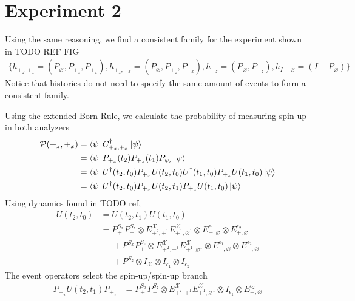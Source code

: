 \section{Experiment 2}

Using the same reasoning, we find a consistent family for the experiment shown in TODO REF FIG
\begin{align}
  \{ h_{+_z,+_x} = \left(P_\varnothing, P_{+_z}, P_{+_x} \right), h_{+_z,-_x} = \left(P_\varnothing, P_{+_z}, P_{-_x} \right), h_{-_z} = \left(P_\varnothing, P_{-_z} \right), h_{I-\varnothing} = \left(I - P_\varnothing \right)\}
\end{align}
Notice that histories do not need to specify the same amount of events to form a consistent family.

Using the extended Born Rule, we calculate the probability of measuring spin up in both analyzers
\begin{align}
  \mathcal{P}(+_z, +_x) &= \bra{\psi} C^\dagger_{+_z, +_x} \ket{\psi} \\ \nonumber
  &= \bra{\psi} P_{+_x}(t_2) P_{+_z}(t_1) P_{\psi_s} \ket{\psi} \\ \nonumber
  &= \bra{\psi} U^\dagger(t_2, t_0) P_{+_x} U(t_2, t_0) U^\dagger(t_1, t_0) P_{+_z} U(t_1, t_0)  \ket{\psi} \\ \nonumber
  &= \bra{\psi} U^\dagger(t_2, t_0) P_{+_x} U(t_2, t_1) P_{+_z} U(t_1, t_0) \ket{\psi}
\end{align}
Using dynamics found in TODO ref,
\begin{align}
  U(t_2, t_0) &= U(t_2, t_1)U(t_1, t_0) \\ \nonumber
  &= P^{S_x}_+ P^{S_z}_+ \otimes E^\mathcal{X}_{+^2, +^1} E^\mathcal{X}_{+^1, \varnothing^1} \otimes E^{\epsilon_1}_{+, \varnothing} \otimes E^{\epsilon_2}_{+, \varnothing} \\ \nonumber
  &\phantom{{} = {}} + P^{S_x}_- P^{S_z}_+ \otimes E^\mathcal{X}_{+^2, -^1} E^\mathcal{X}_{+^1, \varnothing^1} \otimes E^{\epsilon_1}_{+, \varnothing} \otimes E^{\epsilon_2}_{-, \varnothing}\\ \nonumber
  &\phantom{{} = {}}  + P^{S_z}_- \otimes I_\mathcal{X} \otimes I_{\epsilon_1} \otimes I_{\epsilon_2}
\end{align}
The event operators select the spin-up/spin-up branch
\begin{align}
   P_{+_x} U(t_2, t_1) P_{+_z} &= P^{S_x}_+ P^{S_z}_+ \otimes E^\mathcal{X}_{+^2, +^1} E^\mathcal{X}_{+^1, \varnothing^1} \otimes I_{\epsilon_1} \otimes E^{\epsilon_2}_{+, \varnothing}
\end{align}
